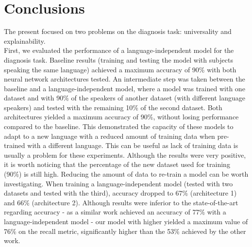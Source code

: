 
\chapter{Conclusions}
\label{ch:magna}


The present focused on two problems on the  diagnosis task: universality and explainability. \\
First, we evaluated the performance of a language-independent model for the  diagnosis task. Baseline results (training and testing the model with subjects speaking the same language) achieved a maximum accuracy of 90\% with both neural network architectures tested. An intermediate step was taken between the baseline and a language-independent model, where a model was trained with one dataset and with 90\% of the speakers of another dataset (with different language speakers) and tested with the remaining 10\% of the second dataset. Both architectures yielded a maximum accuracy of 90\%, without losing performance compared to the baseline. This demonstrated the capacity of these models to adapt to a new language with a reduced amount of training data when pre-trained with a different language. This can be useful as lack of training data is usually a problem for these experiments. Although the results were very positive, it is worth noticing that the percentage of the new dataset used for training (90\%) is still high. Reducing the amount of data to re-train a model can be worth investigating. When training a language-independent model (tested with two datasets and tested with the third), accuracy dropped to 67\% (architecture 1) and 66\% (architecture 2). Although results were inferior to the state-of-the-art regarding accuracy - as a similar work achieved an accuracy of 77\% with a language-independent model \cite{parkinson_three_languages} - our model with higher yielded a maximum value of 76\% on the recall metric, significantly higher than the 53\% achieved by the other work.



